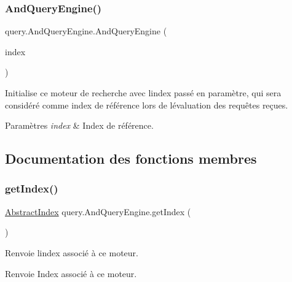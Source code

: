 \subsubsection{\texorpdfstring{And\+Query\+Engine()}{AndQueryEngine()}}
{\footnotesize\ttfamily query.\+And\+Query\+Engine.\+And\+Query\+Engine (\begin{DoxyParamCaption}\item[{\hyperlink{classindexation_1_1AbstractIndex}{Abstract\+Index}}]{index }\end{DoxyParamCaption})}

Initialise ce moteur de recherche avec l\textquotesingle{}index passé en paramètre, qui sera considéré comme index de référence lors de l\textquotesingle{}évaluation des requêtes reçues.


\begin{DoxyParams}{Paramètres}
{\em index} & Index de référence. \\
\hline
\end{DoxyParams}


\subsection{Documentation des fonctions membres}
\mbox{\label{classquery_1_1AndQueryEngine_a1ed58d50e47acd0e0aa5fae1cb91668c}} 
\subsubsection{\texorpdfstring{get\+Index()}{getIndex()}}
{\footnotesize\ttfamily \hyperlink{classindexation_1_1AbstractIndex}{Abstract\+Index} query.\+And\+Query\+Engine.\+get\+Index (\begin{DoxyParamCaption}{ }\end{DoxyParamCaption})}

Renvoie l\textquotesingle{}index associé à ce moteur.

\begin{DoxyReturn}{Renvoie}
Index associé à ce moteur. 
\end{DoxyReturn}
\mbox{\label{classquery_1_1AndQueryEngine_a3a269d6715d08630d6324c5488461225}} 
